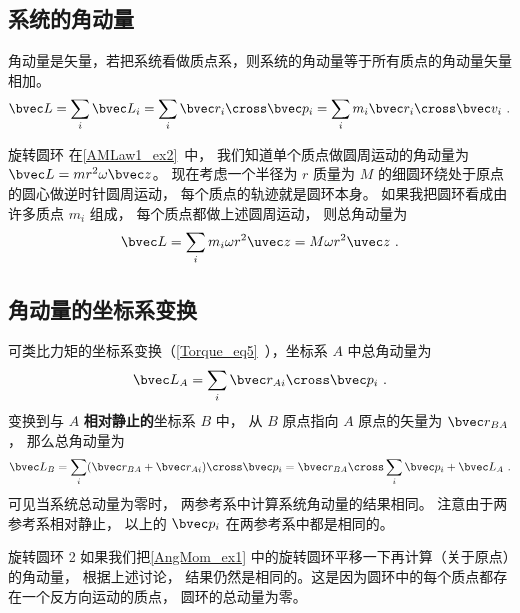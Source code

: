 

\subsection{系统的角动量}
角动量是矢量，若把系统看做质点系，则系统的角动量等于所有质点的角动量矢量相加。
\begin{equation}\label{AngMom_eq1}
\bvec L = \sum_i \bvec L_i = \sum_i \bvec r_i \cross\bvec p_i = \sum_i m_i \bvec r_i \cross\bvec v_i~.
\end{equation}
\begin{example}{旋转圆环}\label{AngMom_ex1}
在\autoref{AMLaw1_ex2}~中， 我们知道单个质点做圆周运动的角动量为 $\bvec L = m r^2 \omega \bvec z$。 现在考虑一个半径为 $r$ 质量为 $M$ 的细圆环绕处于原点的圆心做逆时针圆周运动， 每个质点的轨迹就是圆环本身。 如果我把圆环看成由许多质点 $m_i$ 组成， 每个质点都做上述圆周运动， 则总角动量为
\begin{equation}
\bvec L = \sum_i m_i \omega r^2 \uvec z = M \omega r^2 \uvec z~.
\end{equation}
\end{example}

\subsection{角动量的坐标系变换}
可类比力矩的坐标系变换（\autoref{Torque_eq5}~），坐标系 $A$ 中总角动量为
\begin{equation}
\bvec L_A = \sum_i \bvec r_{Ai} \cross \bvec p_i ~.
\end{equation}
变换到与 $A$ \textbf{相对静止的}坐标系 $B$ 中， 从 $B$ 原点指向 $A$ 原点的矢量为 $\bvec r_{BA}$， 那么总角动量为
\begin{equation}\label{AngMom_eq4}
\bvec L_B = \sum_i (\bvec r_{BA} + \bvec r_{Ai})\cross \bvec p_i = \bvec r_{BA}\cross \sum_i \bvec p_i + \bvec L_A~.
\end{equation}
可见当系统总动量为零时， 两参考系中计算系统角动量的结果相同。 注意由于两参考系相对静止， 以上的 $\bvec p_i$ 在两参考系中都是相同的。

\begin{example}{旋转圆环 2}\label{AngMom_ex2}
如果我们把\autoref{AngMom_ex1} 中的旋转圆环平移一下再计算（关于原点）的角动量， 根据上述讨论， 结果仍然是相同的。这是因为圆环中的每个质点都存在一个反方向运动的质点， 圆环的总动量为零。
\end{example}

